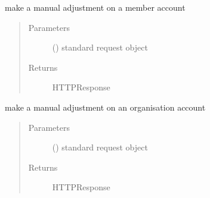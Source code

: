 \documentclass[letterpaper,10pt,english]{sphinxmanual}
\begin{document}

\begin{fulllineitems}
\label{\detokenize{payments:payments.views.manual_adjust_member}}
make a manual adjustment on a member account
\begin{quote}\begin{description}
\item[{Parameters}] \leavevmode
{} () \textendash{} standard request object

\item[{Returns}] \leavevmode
HTTPResponse

\end{description}\end{quote}

\end{fulllineitems}


\begin{fulllineitems}
\label{\detokenize{payments:payments.views.manual_adjust_org}}
make a manual adjustment on an organisation account
\begin{quote}\begin{description}
\item[{Parameters}] \leavevmode
{} () \textendash{} standard request object

\item[{Returns}] \leavevmode
HTTPResponse

\end{description}\end{quote}

\end{fulllineitems}

\end{document}
